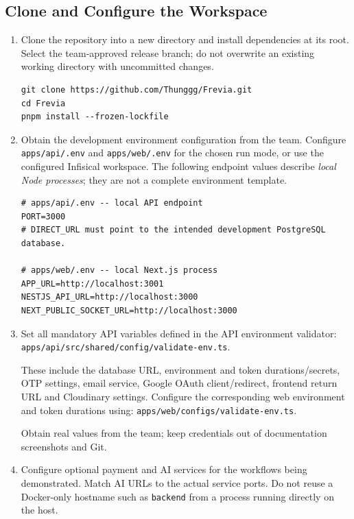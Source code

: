 \subsection{Clone and Configure the Workspace}
\begin{enumerate}[leftmargin=1.8em,itemsep=3pt]
\item Clone the repository into a new directory and install dependencies at its root. Select the team-approved release branch; do not overwrite an existing working directory with uncommitted changes.
\begin{lstlisting}[frame=single,backgroundcolor=\color{codebg}]
git clone https://github.com/Thunggg/Frevia.git
cd Frevia
pnpm install --frozen-lockfile
\end{lstlisting}
\item Obtain the development environment configuration from the team. Configure \nolinkurl{apps/api/.env} and \nolinkurl{apps/web/.env} for the chosen run mode, or use the configured Infisical workspace. The following endpoint values describe \emph{local Node processes}; they are not a complete environment template.
\begin{lstlisting}[frame=single,backgroundcolor=\color{codebg}]
# apps/api/.env -- local API endpoint
PORT=3000
# DIRECT_URL must point to the intended development PostgreSQL database.

# apps/web/.env -- local Next.js process
APP_URL=http://localhost:3001
NESTJS_API_URL=http://localhost:3000
NEXT_PUBLIC_SOCKET_URL=http://localhost:3000
\end{lstlisting}
\item Set all mandatory API variables defined in the API environment validator:\newline
\nolinkurl{apps/api/src/shared/config/validate-env.ts}.\par
These include the database URL, environment and token durations/secrets, OTP settings, email service, Google OAuth client/redirect, frontend return URL and Cloudinary settings. Configure the corresponding web environment and token durations using:\newline
\nolinkurl{apps/web/configs/validate-env.ts}.\par
Obtain real values from the team; keep credentials out of documentation screenshots and Git.
\item Configure optional payment and AI services for the workflows being demonstrated. Match AI URLs to the actual service ports. Do not reuse a Docker-only hostname such as \texttt{backend} from a process running directly on the host.
\end{enumerate}
